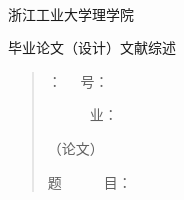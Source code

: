 {

	\setcounter{chapter}{0}			%
	\yemeiclean
	\setcounter{page}{1}            %
	\let\cleardoublepage\relax
	\begin{center}
	\sanhao\hei~
	\\[1cm]
	\xiaoyi\hei 浙江工业大学理学院
	
	毕业论文（设计）文献综述\\[4.5cm]
	\end{center}
	\begin{center}
	
	\begin{quote}
	\song\Sanhao
	：\uline{\song\makebox[3cm]{\xuesheng}}
	~~号：\song\uline{\makebox[4.6cm]{\xuehao}}
	
	~~~~~~业：\song{\uline{\makebox[10cm]{\zhuanye}}}
	
	（论文）
	
	题~~~~~~目：\uline{\makebox[10cm]{\song\timu}}
	
	\uline{\makebox[10cm]{\song\laoshi}}
	
	\end{quote}
	\end{center}
	~\\[6cm]
	\begin{center}
	\song\xiaoer \shijian
	\end{center}
	\thispagestyle{empty}
	\newpage
	
	\renewcommand{\chaptername}{\xCJKnumber{\thechapter}、}
	\titleformat{\chapter}{\sihao\hei\bfseries}{\hei\chaptername}{0em}{}
	\titlespacing{\chapter}{0pt}{\baselineskip}{0pt}
	
	
	\setcounter{page}{1}            %
	\newpage
}

